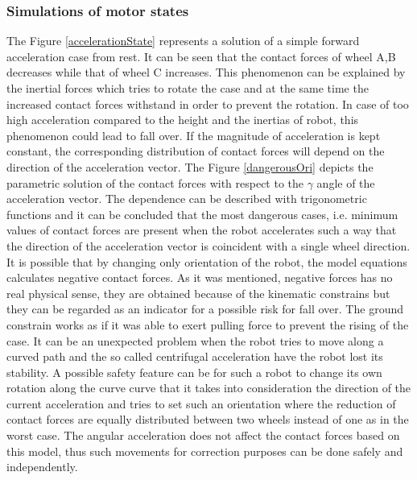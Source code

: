 \documentclass[12pt,english]{article}
\begin{document}
\subsubsection{Simulations of motor states}
The Figure \ref{accelerationState} represents a solution of a simple forward acceleration case from rest. It can be seen that the contact forces of wheel A,B decreases while that of wheel C increases. This phenomenon can be explained by the inertial forces which tries to rotate the case and at the same time the increased contact forces withstand in order to prevent the rotation. In case of too high acceleration compared to the height and the inertias of robot, this phenomenon could lead to fall over. 
If the magnitude of acceleration is kept constant, the corresponding distribution of contact forces will depend on the direction of the acceleration vector.
The Figure \ref{dangerousOri} depicts the parametric solution of the contact forces with respect to the $\gamma$ angle of the acceleration vector. The dependence can be described with trigonometric functions and it can be concluded that the most dangerous cases, i.e. minimum values of contact forces are present when the robot accelerates such a way that the direction of the acceleration vector is coincident with a single wheel direction. It is possible that by changing only orientation of the robot, the model equations calculates negative contact forces. As it was mentioned, negative forces has no real physical sense, they are obtained because of the kinematic constrains but they can be regarded as an indicator for a possible risk for fall over. The ground constrain works as if it was able to exert pulling force to prevent the rising of the case. It can be an unexpected problem when the robot tries to move along a curved path and the so called centrifugal acceleration have the robot lost its stability. A possible safety feature can be for such a robot to change its own rotation along the curve curve that it takes into consideration the direction of the current acceleration and tries to set such an orientation where the reduction of contact forces are equally distributed between two wheels instead of one as in the worst case. The angular acceleration does not affect the contact forces based on this model, thus such movements for correction purposes can be done safely and independently.
\end{document}
